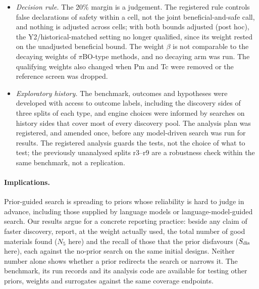 \begin{itemize}
comparable across priors.
\item \emph{Decision rule.} The 20\% margin is a judgement. The registered rule controls false declarations of safety within a
cell, not the joint beneficial-and-safe call, and nothing is adjusted across cells; with both bounds adjusted (post hoc), the
Y2/historical-matched setting no longer qualified, since its weight rested on the unadjusted beneficial bound. The weight $\beta$
is not comparable to the decaying weights of $\pi$BO-type methods, and no decaying arm was run. The qualifying weights
also changed when Pm and Tc were removed or the reference screen was dropped.
\item \emph{Exploratory history.} The benchmark, outcomes and hypotheses were developed with access to outcome labels, including
the discovery sides of three splits of each type, and engine choices were informed by searches on history sides that cover most
of every discovery pool. The analysis plan was registered, and amended once, before any model-driven search was run for
results. The registered analysis guards the tests, not the choice of what to test; the previously unanalysed
splits r3--r9 are a robustness check within the same benchmark, not a replication.
\end{itemize}

\paragraph{Implications.} Prior-guided search is spreading to priors whose reliability is hard to judge in advance, including
those supplied by language models\cite{chen2026evidencegated} or language-model-guided search\cite{liu2024llambo}. Our results argue for a concrete reporting practice: beside any claim of faster discovery, report, at the weight actually
used, the total number of good materials found ($N_5$ here) and the recall of those that the prior disfavours ($S_{\mathrm{dis}}$ here), each
against the no-prior search on the same initial designs. Neither number alone shows whether a prior redirects the search or
narrows it.
The benchmark, its run records and its analysis code are available for testing other priors, weights and surrogates against the
same coverage endpoints.

